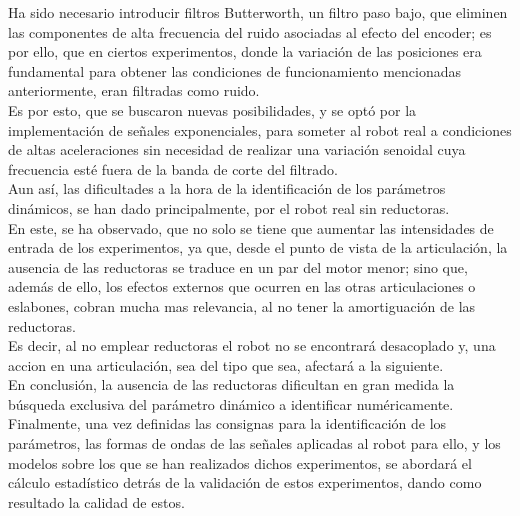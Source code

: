 Ha sido necesario introducir filtros Butterworth, un filtro paso bajo, que eliminen las componentes de alta frecuencia del ruido asociadas al efecto del encoder; es por ello, que en ciertos experimentos, donde la variación de las posiciones era fundamental para obtener las condiciones de funcionamiento mencionadas anteriormente, eran filtradas como ruido. \\
Es por esto, que se buscaron nuevas posibilidades, y se optó por la implementación de señales exponenciales, para someter al robot real a condiciones de altas aceleraciones sin necesidad de realizar una variación senoidal cuya frecuencia esté fuera de la banda de corte del filtrado.\\

Aun así, las dificultades a la hora de la identificación de los parámetros dinámicos, se han dado principalmente, por el robot real sin reductoras.\\
En este, se ha observado, que no solo se tiene que aumentar las intensidades de entrada de los experimentos, ya que, desde el punto de vista de la articulación, la ausencia de las reductoras se traduce en un par del motor menor; sino que, además de ello, los efectos externos que ocurren en las otras articulaciones o eslabones, cobran mucha mas relevancia, al no tener la amortiguación de las reductoras. \\
Es decir, al no emplear reductoras el robot no se encontrará desacoplado y, una accion en una articulación, sea del tipo que sea, afectará a la siguiente.\\
En conclusión, la ausencia de las reductoras dificultan en gran medida la búsqueda exclusiva del parámetro dinámico a identificar numéricamente.\\

Finalmente, una vez definidas las consignas para la identificación de los parámetros, las formas de ondas de las señales aplicadas al robot para ello, y los modelos sobre los que se han realizados dichos experimentos, se abordará el cálculo  estadístico detrás de la validación de estos experimentos, dando como resultado la calidad de estos.\\

